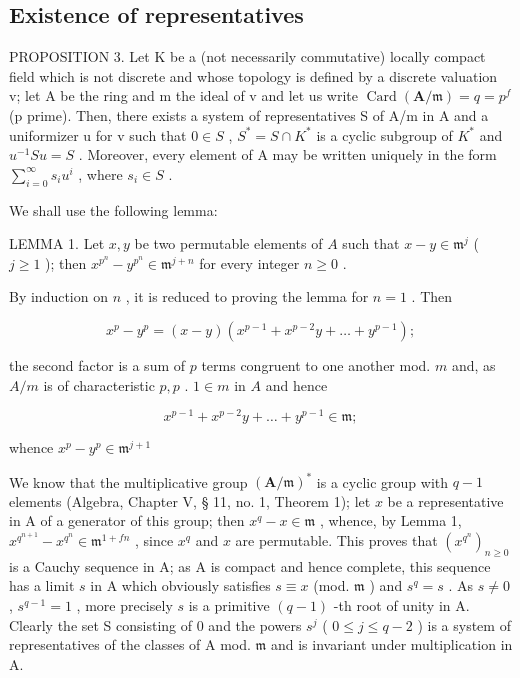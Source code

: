 \subsection{Existence of representatives}

PROPOSITION 3. Let K be a (not necessarily commutative) locally compact field which is not discrete and whose topology is defined by a discrete valuation v; let A be the ring and m the ideal of v and let us write \(\operatorname{Card}(\mathbf{A}/\mathfrak{m}) = q = p^{f}\) (p prime). Then, there exists a system of representatives S of A/m in A and a uniformizer u for v such that \(0 \in S\) , \(S^{*} = S \cap K^{*}\) is a cyclic subgroup of \(K^{*}\) and \(u^{-1} Su = S\) . Moreover, every element of A may be written uniquely in the form \(\sum_{i=0}^{\infty} s_{i} u^{i}\) , where \(s_{i} \in S\) .

We shall use the following lemma:

LEMMA 1. Let \(x, y\) be two permutable elements of \(A\) such that \(x - y \in \mathfrak{m}^j\) ( \(j \geqslant 1\) ); then \(x^{p^n} - y^{p^n} \in \mathfrak{m}^{j + n}\) for every integer \(n \geqslant 0\) .

By induction on \(n\) , it is reduced to proving the lemma for \(n = 1\) . Then

\[
x ^ {p} - y ^ {p} = (x - y) \left(x ^ {p - 1} + x ^ {p - 2} y + \dots + y ^ {p - 1}\right);
\]

the second factor is a sum of \(p\) terms congruent to one another mod. \(m\) and, as \(A / m\) is of characteristic \(p, p\) . \(1 \in m\) in \(A\) and hence

\[
x ^ {p - 1} + x ^ {p - 2} y + \dots + y ^ {p - 1} \in \mathfrak {m};
\]

whence \(x^{p} - y^{p}\in \mathfrak{m}^{j + 1}\)

We know that the multiplicative group \((\mathbf{A} / \mathfrak{m})^*\) is a cyclic group with \(q - 1\) elements (Algebra, Chapter V, § 11, no. 1, Theorem 1); let \(x\) be a representative in A of a generator of this group; then \(x^{q} - x \in \mathfrak{m}\) , whence, by Lemma 1, \(x^{q^{n + 1}} - x^{q^n} \in \mathfrak{m}^{1 + fn}\) , since \(x^{q}\) and \(x\) are permutable. This proves that \((x^{q^n})_{n \geqslant 0}\) is a Cauchy sequence in A; as A is compact and hence complete, this sequence has a limit \(s\) in A which obviously satisfies \(s \equiv x\) (mod. \(\mathfrak{m}\) ) and \(s^q = s\) . As \(s \neq 0\) , \(s^{q - 1} = 1\) , more precisely \(s\) is a primitive \((q - 1)\) -th root of unity in A. Clearly the set S consisting of 0 and the powers \(s^j\) ( \(0 \leqslant j \leqslant q - 2\) ) is a system of representatives of the classes of A mod. \(\mathfrak{m}\) and is invariant under multiplication in A.

